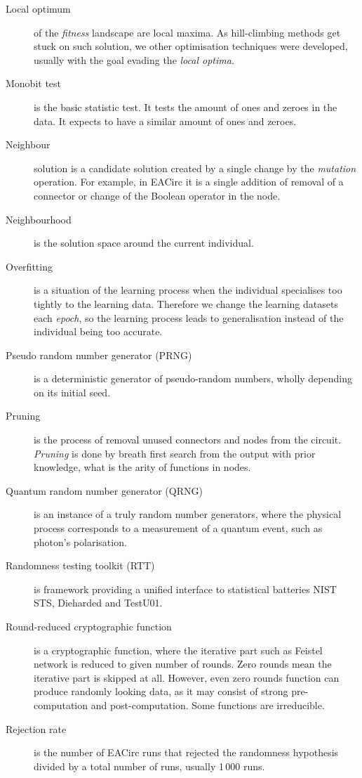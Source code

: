 \documentclass[
    digital,    %
    oneside,    %
    color,
    11pt,
    nocover,
    notable,
    nolof,
    nolot,
]{fithesis3}
\begin{document}
\begin{description}
    \item[Local optimum] of the \textit{fitness} landscape are local maxima. As hill-climbing methods get stuck on such solution, we other optimisation techniques were developed, usually with the goal evading the \textit{local optima}.
    \item[Monobit test] is the basic statistic test. It tests the amount of ones and zeroes in the data. It expects to have a similar amount of ones and zeroes.
    \item[Neighbour] solution is a candidate solution created by a single change by the \textit{mutation} operation. For example, in EACirc it is a single addition of removal of a connector or change of the Boolean operator in the node.
    \item[Neighbourhood] is the solution space around the current individual.
    \item[Overfitting] is a situation of the learning process when the individual specialises too tightly to the learning data. Therefore we change the learning datasets each \textit{epoch}, so the learning process leads to generalisation instead of the individual being too accurate.
    \item[Pseudo random number generator (PRNG)] is a deterministic generator of pseudo-random numbers, wholly depending on its initial seed.
    \item[Pruning] is the process of removal unused connectors and nodes from the circuit. \textit{Pruning} is done by breath first search from the output with prior knowledge, what is the arity of functions in nodes.
    \item[Quantum random number generator (QRNG)] is an instance of a truly random number generators, where the physical process corresponds to a measurement of a quantum event, such as photon's polarisation.
    \item[Randomness testing toolkit (RTT)] is framework providing a unified interface to statistical batteries NIST STS, Dieharded and TestU01.
    \item[Round-reduced cryptographic function] is a cryptographic function, where the iterative part such as Feistel network is reduced to given number of rounds. Zero rounds mean the iterative part is skipped at all. However, even zero rounds function can produce randomly looking data, as it may consist of strong pre-computation and post-computation. Some functions are irreducible.
    \item[Rejection rate] is the number of EACirc runs that rejected the randomness hypothesis divided by a total number of runs, usually 1\,000 runs.

\end{description}
\end{document}
